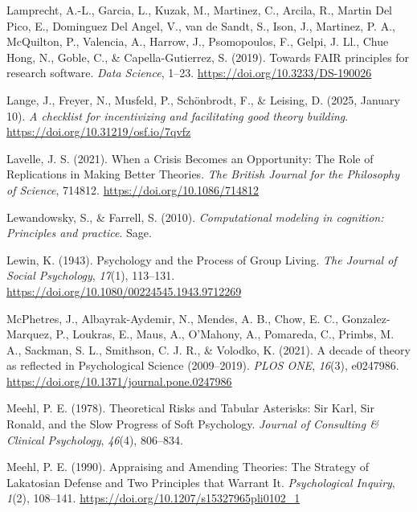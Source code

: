 \documentclass[
  man, noextraspace,floatsintext]{apa7}
\newlength{\cslhangindent}
\newenvironment{CSLReferences}[2] %
 {\begin{list}{}{%
  \setlength{\itemindent}{0pt}
  \setlength{\leftmargin}{0pt}
  \setlength{\parsep}{0pt}
  \ifodd #1
   \setlength{\leftmargin}{\cslhangindent}
   \setlength{\itemindent}{-1\cslhangindent}
  \fi
  \setlength{\itemsep}{#2\baselineskip}}}
 {\end{list}}
\begin{document}
\begin{CSLReferences}{1}{0}
Lamprecht, A.-L., Garcia, L., Kuzak, M., Martinez, C., Arcila, R., Martin Del Pico, E., Dominguez Del Angel, V., van de Sandt, S., Ison, J., Martinez, P. A., McQuilton, P., Valencia, A., Harrow, J., Psomopoulos, F., Gelpi, J. Ll., Chue Hong, N., Goble, C., \& Capella-Gutierrez, S. (2019). Towards {FAIR} principles for research software. \emph{Data Science}, 1--23. \url{https://doi.org/10.3233/DS-190026}

Lange, J., Freyer, N., Musfeld, P., Schönbrodt, F., \& Leising, D. (2025, January 10). \emph{A checklist for incentivizing and facilitating good theory building}. \url{https://doi.org/10.31219/osf.io/7qvfz}

Lavelle, J. S. (2021). When a {Crisis Becomes} an {Opportunity}: {The Role} of {Replications} in {Making Better Theories}. \emph{The British Journal for the Philosophy of Science}, 714812. \url{https://doi.org/10.1086/714812}

Lewandowsky, S., \& Farrell, S. (2010). \emph{Computational modeling in cognition: {Principles} and practice}. Sage.

Lewin, K. (1943). Psychology and the {Process} of {Group Living}. \emph{The Journal of Social Psychology}, \emph{17}(1), 113--131. \url{https://doi.org/10.1080/00224545.1943.9712269}

McPhetres, J., Albayrak-Aydemir, N., Mendes, A. B., Chow, E. C., Gonzalez-Marquez, P., Loukras, E., Maus, A., O'Mahony, A., Pomareda, C., Primbs, M. A., Sackman, S. L., Smithson, C. J. R., \& Volodko, K. (2021). A decade of theory as reflected in {Psychological Science} (2009--2019). \emph{PLOS ONE}, \emph{16}(3), e0247986. \url{https://doi.org/10.1371/journal.pone.0247986}

Meehl, P. E. (1978). Theoretical {Risks} and {Tabular Asterisks}: {Sir Karl}, {Sir Ronald}, and the {Slow Progress} of {Soft Psychology}. \emph{Journal of Consulting \& Clinical Psychology}, \emph{46}(4), 806--834.

Meehl, P. E. (1990). Appraising and {Amending Theories}: {The Strategy} of {Lakatosian Defense} and {Two Principles} that {Warrant It}. \emph{Psychological Inquiry}, \emph{1}(2), 108--141. \url{https://doi.org/10.1207/s15327965pli0102_1}


\end{CSLReferences}
\end{document}
